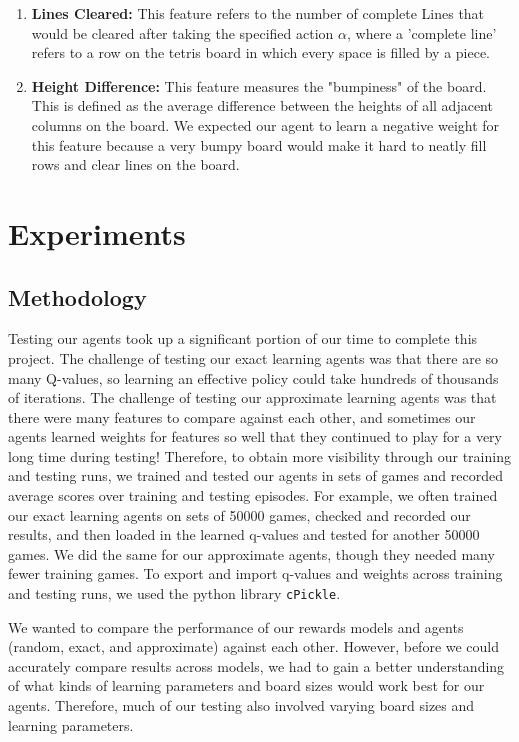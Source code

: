 \documentclass[11pt]{article}
\begin{document}
\begin{enumerate}
    \item \textbf{Lines Cleared:}
    This feature refers to the number of complete Lines that would be cleared after taking the specified action $\alpha$, where a 'complete line' refers to a row on the tetris board in which every space is filled by a piece.
    \item \textbf{Height Difference:}
    This feature measures the "bumpiness" of the board. This is defined as the average difference between the heights of all adjacent columns on the board. We expected our agent to learn a negative weight for this feature because a very bumpy board would make it hard to neatly fill rows and clear lines on the board.
\end{enumerate}

\section{Experiments}

\subsection{Methodology}
Testing our agents took up a significant portion of our time to complete this project. The challenge of testing our exact learning agents was that there are so many Q-values, so learning an effective policy could take hundreds of thousands of iterations. The challenge of testing our approximate learning agents was that there were many features to compare against each other, and sometimes our agents learned weights for features so well that they continued to play for a very long time during testing! Therefore, to obtain more visibility through our training and testing runs, we trained and tested our agents in sets of games and recorded average scores over training and testing episodes. For example, we often trained our exact learning agents on sets of 50000 games, checked and recorded our results, and then loaded in the learned q-values and tested for another 50000 games. We did the same for our approximate agents, though they needed many fewer training games. To export and import q-values and weights across training and testing runs, we used the python library \texttt{cPickle}.

\bigskip

We wanted to compare the performance of our rewards models and agents (random, exact, and approximate) against each other. However, before we could accurately compare results across models, we had to gain a better understanding of what kinds of learning parameters and board sizes would work best for our agents. Therefore, much of our testing also involved varying board sizes and learning parameters.
\end{document}
